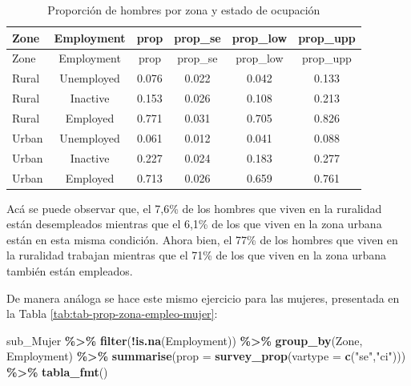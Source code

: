 \documentclass[
  spanish,
  12pt,
]{book}
\newenvironment{Shaded}{\begin{snugshade}}{\end{snugshade}}
\newcommand{\AttributeTok}[1]{\textcolor[rgb]{0.13,0.29,0.53}{#1}}
\newcommand{\FunctionTok}[1]{\textcolor[rgb]{0.13,0.29,0.53}{\textbf{#1}}}
\newcommand{\NormalTok}[1]{#1}
\newcommand{\SpecialCharTok}[1]{\textcolor[rgb]{0.81,0.36,0.00}{\textbf{#1}}}
\newcommand{\StringTok}[1]{\textcolor[rgb]{0.31,0.60,0.02}{#1}}
\begin{document}
\begin{longtable}[]{@{}lccccc@{}}
\caption{\label{tab:tab-prop-zona-empleo-hombre}Proporción de hombres por zona y estado de ocupación}\tabularnewline
\toprule\noalign{}
Zone & Employment & prop & prop\_se & prop\_low & prop\_upp \\
\midrule\noalign{}
\endfirsthead
\toprule\noalign{}
Zone & Employment & prop & prop\_se & prop\_low & prop\_upp \\
\midrule\noalign{}
\endhead
\bottomrule\noalign{}
\endlastfoot
Rural & Unemployed & 0.076 & 0.022 & 0.042 & 0.133 \\
Rural & Inactive & 0.153 & 0.026 & 0.108 & 0.213 \\
Rural & Employed & 0.771 & 0.031 & 0.705 & 0.826 \\
Urban & Unemployed & 0.061 & 0.012 & 0.041 & 0.088 \\
Urban & Inactive & 0.227 & 0.024 & 0.183 & 0.277 \\
Urban & Employed & 0.713 & 0.026 & 0.659 & 0.761 \\
\end{longtable}

Acá se puede observar que, el 7,6\% de los hombres que viven en la ruralidad están desempleados mientras que el 6,1\% de los que viven en la zona urbana están en esta misma condición. Ahora bien, el 77\% de los hombres que viven en la ruralidad trabajan mientras que el 71\% de los que viven en la zona urbana también están empleados.

De manera análoga se hace este mismo ejercicio para las mujeres, presentada en la Tabla \ref{tab:tab-prop-zona-empleo-mujer}:

\begin{Shaded}
\begin{Highlighting}[]
\NormalTok{sub\_Mujer }\SpecialCharTok{\%\textgreater{}\%} 
    \FunctionTok{filter}\NormalTok{(}\SpecialCharTok{!}\FunctionTok{is.na}\NormalTok{(Employment)) }\SpecialCharTok{\%\textgreater{}\%}
    \FunctionTok{group\_by}\NormalTok{(Zone, Employment) }\SpecialCharTok{\%\textgreater{}\%} 
    \FunctionTok{summarise}\NormalTok{(}\AttributeTok{prop =} \FunctionTok{survey\_prop}\NormalTok{(}\AttributeTok{vartype =} \FunctionTok{c}\NormalTok{(}\StringTok{"se"}\NormalTok{,}\StringTok{"ci"}\NormalTok{))) }\SpecialCharTok{\%\textgreater{}\%}
  \FunctionTok{tabla\_fmt}\NormalTok{()}
\end{Highlighting}
\end{Shaded}
\end{document}
